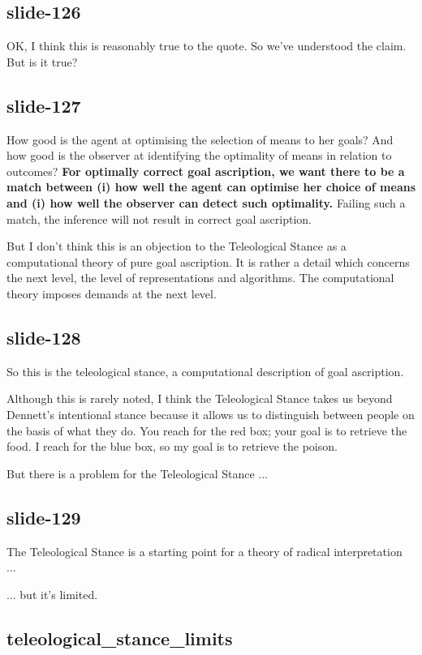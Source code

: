 \documentclass[12pt,\papersize]{extarticle}
\begin{document}
\subsection{slide-126}
OK, I think this is reasonably true to the quote.
So we’ve understood the claim.
But is it true?

\subsection{slide-127}
How good is the agent at optimising the selection of means to her goals?
And how good is the observer at identifying the optimality of means in relation to outcomes?
\textbf{
For optimally correct goal ascription, we want there to be a match between
(i) how well the agent can optimise her choice of means
and
(i) how well the observer can detect such optimality.}
Failing such a match, the inference will not result in correct goal ascription.

But I don’t think this is an objection to the Teleological Stance as a
computational theory of pure goal ascription.  It is rather a detail
which concerns the next level, the level of representations and algorithms.
The computational theory imposes demands at the next level.

\subsection{slide-128}
So this is the teleological stance, a computational description
of goal ascription.

Although this is rarely noted,
I think the Teleological Stance takes us beyond Dennett’s intentional stance
because it allows us to distinguish between people on the basis of what
they do.
You reach for the red box; your goal is to retrieve the food.
I reach for the blue box, so my goal is to retrieve the poison.

But there is a problem for the Teleological Stance ...

\subsection{slide-129}
The Teleological Stance is a starting point for a theory of radical interpretation ...

... but it’s limited.


\subsection{teleological\_stance\_limits}
\end{document}
